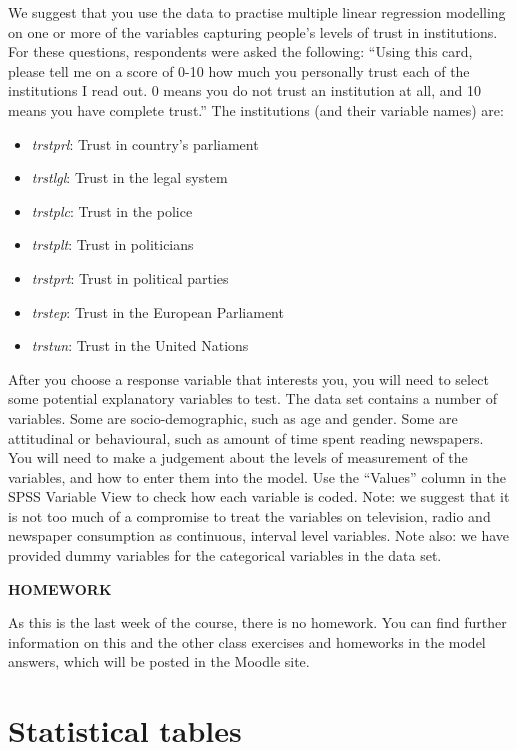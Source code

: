 We suggest that you use the data to practise multiple linear regression modelling on one or more of the variables
capturing people's levels of trust in institutions. For these questions, respondents were asked the
following: ``Using this card, please tell me on a score of 0-10 how much you personally trust each
of the institutions I read out. 0 means you do not trust an institution at all, and 10 means you
have complete trust.''
The institutions (and their variable names) are:
\begin{itemize}
\item
\emph{trstprl}: Trust in country's parliament
\item
\emph{trstlgl}: Trust in the legal system
\item
\emph{trstplc}: Trust in the police
\item
\emph{trstplt}: Trust in politicians
\item
\emph{trstprt}: Trust in political parties
\item
\emph{trstep}: Trust in the European Parliament
\item
\emph{trstun}: Trust in the United Nations
\end{itemize}

After you choose a response variable that interests you, you will need to select some potential
explanatory variables to test. The data set contains a number of variables. Some are socio-demographic,
such as age and gender.
Some are attitudinal or behavioural, such as amount of time spent reading newspapers. You will need to make a
judgement about the levels of measurement of the variables, and how to enter them into the model. Use the ``Values''
column in the SPSS Variable View to check how each variable is coded. Note: we suggest
that it is not too much of a compromise to treat the variables on television, radio and newspaper consumption
as continuous, interval level variables. Note also: we have provided dummy variables for the
categorical variables in the data set.






\textbf{HOMEWORK}

As this is the last week of the course, there is no homework. You can
find further information on this and the other class exercises and
homeworks in the model answers, which will be posted in the Moodle site.

\newpage
\chapter{
Statistical tables}
\label{c_disttables}



